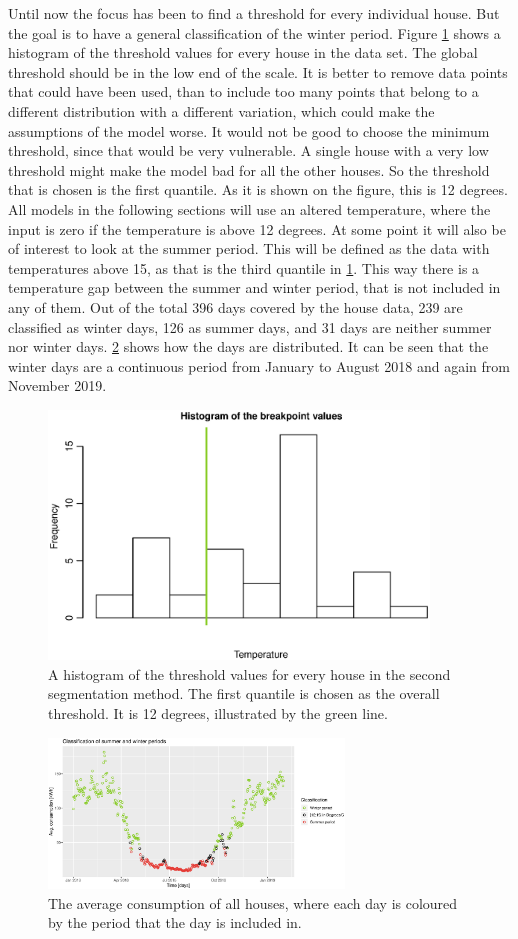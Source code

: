\noindent Until now the focus has been to find a threshold for every individual house. But the goal is to have a general classification of the winter period. Figure \ref{fig: AlphaHist} shows a histogram of the threshold values for every house in the data set. The global threshold should be in the low end of the scale. It is better to remove data points that could have been used, than to include too many points that belong to a different distribution with a different variation, which could make the assumptions of the model worse. It would not be good to choose the minimum threshold, since that would be very vulnerable. A single house with a very low threshold might make the model bad for all the other houses. So the threshold that is chosen is the first quantile. As it is shown on the figure, this is 12 degrees. All models in the following sections will use an altered temperature, where the input is zero if the temperature is above 12 degrees. At some point it will also be of interest to look at the summer period. This will be defined as the data with temperatures above 15, as that is the third quantile in \cref{fig: AlphaHist}. This way there is a temperature gap between the summer and winter period, that is not included in any of them. Out of the total 396 days covered by the house data, 239 are classified as winter days, 126 as summer days, and 31 days are neither summer nor winter days. \cref{fig: class_break_point} shows how the days are distributed. It can be seen that the winter days are a continuous period from January to August 2018 and again from November 2019.
\begin{figure}[ht]
    \centering
    \includegraphics[width=0.9\textwidth]{../../../figures/AlphaHist.eps}
    \caption{A histogram of the threshold values for every house in the second segmentation method. The first quantile is chosen as the overall threshold. It is 12 degrees, illustrated by the green line.}
    \label{fig: AlphaHist}
\end{figure}
\begin{figure}[ht]
    \centering
    \includegraphics[width=0.7\textwidth]{../../../figures/class_breakpoint.eps}
    \caption{The average consumption of all houses, where each day is coloured by the period that the day is included in.}
    \label{fig: class_break_point}
\end{figure}
